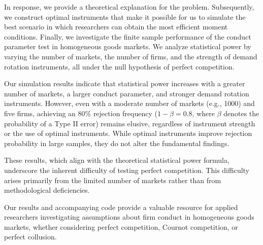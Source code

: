 \documentclass[11pt, a4paper]{article}
\begin{document}
In response, we provide a theoretical explanation for the problem.
Subsequently, we construct optimal instruments that make it possible for us to simulate the best scenario in which researchers can obtain the most efficient moment conditions.
Finally, we investigate the finite sample performance of the conduct parameter test in homogeneous goods markets.
We analyze statistical power by varying the number of markets, the number of firms, and the strength of demand rotation instruments, all under the null hypothesis of perfect competition.

Our simulation results indicate that statistical power increases with a greater number of markets, a larger conduct parameter, and stronger demand rotation instruments. 
However, even with a moderate number of markets (e.g., 1000) and five firms, achieving an 80\% rejection frequency ($1-\beta=0.8$, where $\beta$ denotes the probability of a Type II error) remains elusive, regardless of instrument strength or the use of optimal instruments. 
While optimal instruments improve rejection probability in large samples, they do not alter the fundamental findings.

These results, which align with the theoretical statistical power formula, underscore the inherent difficulty of testing perfect competition.
This difficulty arises primarily from the limited number of markets rather than from methodological deficiencies.

Our results and accompanying code provide a valuable resource for applied researchers investigating assumptions about firm conduct in homogeneous goods markets, whether considering perfect competition, Cournot competition, or perfect collusion.
\end{document}

